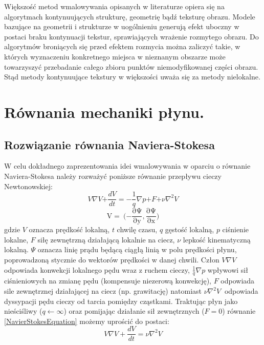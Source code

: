 \documentclass[12pt, twoside, openany]{report}
\theoremstyle{definition}
\begin{document}
Większość metod wmalowywania opisanych w literaturze opiera się na algorytmach kontynuujących strukturę, geometrię bądź teksturę obrazu. Modele bazujące na geometrii i strukturze w uogólnieniu generują efekt uboczny w postaci braku kontynuacji tekstur, sprawiających wrażenie rozmytego obrazu. Do algorytmów broniących się przed efektem rozmycia można zaliczyć takie, w których wyznaczeniu konkretnego miejsca w nieznanym obszarze może towarzyszyć przebadanie całego zbioru punktów niemodyfikowanej części obrazu. Stąd metody kontynuujące tekstury w większości uważa się za metody nielokalne.
\chapter{Równania mechaniki płynu.}
\label{chap:navierstokes}
\section{Rozwiązanie równania Naviera-Stokesa }
W celu dokładnego zaprezentowania idei wmalowywania w oparciu o równanie Naviera-Stokesa należy rozważyć poniższe równanie przepływu cieczy Newtonowskiej:
\begin{equation}
V \nabla V \mathrm{+} \frac{dV}{dt} = - \frac{\mathrm{1}}{q}\nabla p\mathrm{+}F \mathrm{+}\nu {\nabla }^{\mathrm{2}} V
\label{NavierStokesEquation}
\end{equation}
\begin{equation}
\mathrm{V=\ (-}\frac{\mathrm{\partial }\mathrm{\Psi }}{\mathrm{\partial }\mathrm{y}},\frac{\mathrm{\partial }\mathrm{\Psi }}{\mathrm{\partial }\mathrm{x}}\mathrm{)}
\label{LiquidVelociy}
\end{equation}
gdzie $V$ oznacza prędkość lokalną, $t$ chwilę czasu, $q$ gęstość lokalną, $p$ ciśnienie lokalne, $F$ siłę zewnętrzną działającą lokalnie na ciecz, $\nu$ lepkość kinematyczną lokalną. $\mathit{\Psi}$ oznacza linię prądu będącą ciągłą linią w polu prędkości płynu, poprowadzoną
stycznie do wektorów prędkości w danej chwili. Człon $V\nabla V$ odpowiada konwekcji lokalnego pędu wraz z ruchem cieczy, $\frac{1}{q}\nabla p$ wpływowi sił ciśnieniowych na zmianę pędu (kompensuje niezerową konwekcję),  $F$ odpowiada sile zewnętrznej działającej na ciecz (np. grawitację) natomiast $\nu {\nabla }^2V\ $ odpowiada dyssypacji pędu cieczy od tarcia pomiędzy cząstkami. Traktując płyn jako nieściśliwy ($q \leftarrow \infty $)  oraz pomijając działanie sił zewnętrznych ($F=0$)  równanie \eqref{NavierStokesEquation} możemy uprościć do postaci:
\begin{equation}
 V\nabla V+\frac{dV}{dt}=\nu {\nabla }^2V
\label{NavierStokesEquationShort}
\end{equation}
\end{document}
